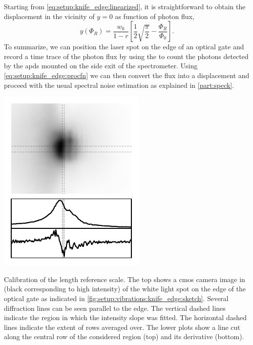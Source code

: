 Starting from \cref{eq:setup:knife_edge:linearized}, it is straightforward to obtain the displacement in the vicinity of $y=0$ as function of photon flux,
\begin{equation}\label{eq:setup:knife_edge:procfn}
     y(\Phi_R) = \frac{w_0}{1-r}\left[\frac{1}{2}\sqrt{\frac{\pi}{2}} - \frac{\Phi_R}{\Phi_0}\right].
\end{equation}
To summarize, we can position the laser spot on the edge of an optical gate and record a time trace of the photon flux by using the \tagger to count the photons detected by the \glspl{apd} mounted on the side exit of the spectrometer.
Using \cref{eq:setup:knife_edge:procfn} we can then convert the flux into a displacement and proceed with the usual spectral noise estimation as explained in \cref{part:speck}.

\begin{marginfigure}
    \centering
    \includegraphics{img/pdf/setup/knife_edge}
    \caption[]{
        Calibration of the length reference scale.
        The top shows a \acrshort{cmos} camera image in (black corresponding to high intensity) of the white light spot on the edge of the optical gate as indicated in \cref{fig:setup:vibrations:knife_edge:sketch}.
        Several diffraction lines can be seen parallel to the edge.
        The vertical dashed lines indicate the region in which the intensity slope was fitted.
        The horizontal dashed lines indicate the extent of rows averaged over.
        The lower plots show a line cut along the central row of the considered region (top) and its derivative (bottom).
    }
    \label{fig:setup:vibrations:calibration:length_scale}
\end{marginfigure}

